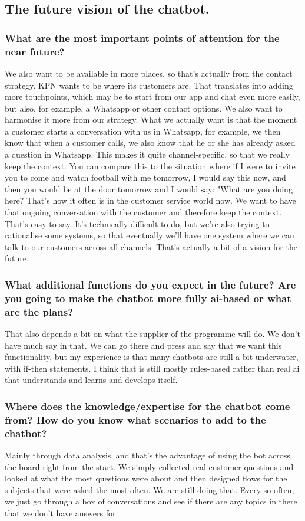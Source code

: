\begin{appendices}
	\subsection{The future vision of the chatbot.}
	\subsubsection{What are the most important points of attention for the near future?}
	We also want to be available in more places, so that's actually from the contact strategy. KPN wants to be where its customers are. That translates into adding more touchpoints, which may be to start from our app and chat even more easily, but also, for example, a Whatsapp or other contact options. We also want to harmonise it more from our strategy. What we actually want is that the moment a customer starts a conversation with us in Whatsapp, for example, we then know that when a customer calls, we also know that he or she has already asked a question in Whatsapp. This makes it quite channel-specific, so that we really keep the context. You can compare this to the situation where if I were to invite you to come and watch football with me tomorrow, I would say this now, and then you would be at the door tomorrow and I would say: "What are you doing here? That's how it often is in the customer service world now. We want to have that ongoing conversation with the customer and therefore keep the context. That's easy to say. It's technically difficult to do, but we're also trying to rationalise some systems, so that eventually we'll have one system where we can talk to our customers across all channels. That's actually a bit of a vision for the future.
	
	\subsubsection{What additional functions do you expect in the future? Are you going to make the chatbot more fully \acrshort{ai}-based or what are the plans?}
	That also depends a bit on what the supplier of the programme will do. We don't have much say in that. We can go there and press and say that we want this functionality, but my experience is that many chatbots are still a bit underwater, with if-then statements. I think that is still mostly rules-based rather than real \acrshort{ai} that understands and learns and develops itself.
	
	\subsubsection{Where does the knowledge/expertise for the chatbot come from? How do you know what scenarios to add to the chatbot?}
	Mainly through data analysis, and that's the advantage of using the bot across the board right from the start. We simply collected real customer questions and looked at what the most questions were about and then designed flows for the subjects that were asked the most often. We are still doing that. Every so often, we just go through a box of conversations and see if there are any topics in there that we don't have answers for.
	

\end{appendices}
